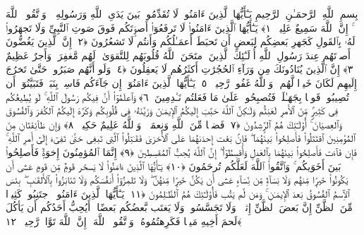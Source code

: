 
  
    
  
    
    

\nopagebreak
  بِسمِ ٱللَّهِ ٱلرَّحمَـٰنِ ٱلرَّحِيمِ
  يَـٰٓأَيُّهَا ٱلَّذِينَ ءَامَنُوا۟ لَا تُقَدِّمُوا۟ بَينَ يَدَىِ ٱللَّهِ وَرَسُولِهِۦ ۖ وَٱتَّقُوا۟ ٱللَّهَ ۚ إِنَّ ٱللَّهَ سَمِيعٌ عَلِيمٌۭ ﴿١﴾
 يَـٰٓأَيُّهَا ٱلَّذِينَ ءَامَنُوا۟ لَا تَرفَعُوٓا۟ أَصوَٟتَكُم فَوقَ صَوتِ ٱلنَّبِىِّ وَلَا تَجهَرُوا۟ لَهُۥ بِٱلقَولِ كَجَهرِ بَعضِكُم لِبَعضٍ أَن تَحبَطَ أَعمَـٰلُكُم وَأَنتُم لَا تَشعُرُونَ ﴿٢﴾
 إِنَّ ٱلَّذِينَ يَغُضُّونَ أَصوَٟتَهُم عِندَ رَسُولِ ٱللَّهِ أُو۟لَـٰٓئِكَ ٱلَّذِينَ ٱمتَحَنَ ٱللَّهُ قُلُوبَهُم لِلتَّقوَىٰ ۚ لَهُم مَّغفِرَةٌۭ وَأَجرٌ عَظِيمٌ ﴿٣﴾
 إِنَّ ٱلَّذِينَ يُنَادُونَكَ مِن وَرَآءِ ٱلحُجُرَٰتِ أَكثَرُهُم لَا يَعقِلُونَ ﴿٤﴾
 وَلَو أَنَّهُم صَبَرُوا۟ حَتَّىٰ تَخرُجَ إِلَيهِم لَكَانَ خَيرًۭا لَّهُم ۚ وَٱللَّهُ غَفُورٌۭ رَّحِيمٌۭ ﴿٥﴾
 يَـٰٓأَيُّهَا ٱلَّذِينَ ءَامَنُوٓا۟ إِن جَآءَكُم فَاسِقٌۢ بِنَبَإٍۢ فَتَبَيَّنُوٓا۟ أَن تُصِيبُوا۟ قَومًۢا بِجَهَـٰلَةٍۢ فَتُصبِحُوا۟ عَلَىٰ مَا فَعَلتُم نَـٰدِمِينَ ﴿٦﴾
 وَٱعلَمُوٓا۟ أَنَّ فِيكُم رَسُولَ ٱللَّهِ ۚ لَو يُطِيعُكُم فِى كَثِيرٍۢ مِّنَ ٱلأَمرِ لَعَنِتُّم وَلَـٰكِنَّ ٱللَّهَ حَبَّبَ إِلَيكُمُ ٱلإِيمَـٰنَ وَزَيَّنَهُۥ فِى قُلُوبِكُم وَكَرَّهَ إِلَيكُمُ ٱلكُفرَ وَٱلفُسُوقَ وَٱلعِصيَانَ ۚ أُو۟لَـٰٓئِكَ هُمُ ٱلرَّٟشِدُونَ ﴿٧﴾
 فَضلًۭا مِّنَ ٱللَّهِ وَنِعمَةًۭ ۚ وَٱللَّهُ عَلِيمٌ حَكِيمٌۭ ﴿٨﴾
 وَإِن طَآئِفَتَانِ مِنَ ٱلمُؤمِنِينَ ٱقتَتَلُوا۟ فَأَصلِحُوا۟ بَينَهُمَا ۖ فَإِنۢ بَغَت إِحدَىٰهُمَا عَلَى ٱلأُخرَىٰ فَقَـٰتِلُوا۟ ٱلَّتِى تَبغِى حَتَّىٰ تَفِىٓءَ إِلَىٰٓ أَمرِ ٱللَّهِ ۚ فَإِن فَآءَت فَأَصلِحُوا۟ بَينَهُمَا بِٱلعَدلِ وَأَقسِطُوٓا۟ ۖ إِنَّ ٱللَّهَ يُحِبُّ ٱلمُقسِطِينَ ﴿٩﴾
 إِنَّمَا ٱلمُؤمِنُونَ إِخوَةٌۭ فَأَصلِحُوا۟ بَينَ أَخَوَيكُم ۚ وَٱتَّقُوا۟ ٱللَّهَ لَعَلَّكُم تُرحَمُونَ ﴿١٠﴾
 يَـٰٓأَيُّهَا ٱلَّذِينَ ءَامَنُوا۟ لَا يَسخَر قَومٌۭ مِّن قَومٍ عَسَىٰٓ أَن يَكُونُوا۟ خَيرًۭا مِّنهُم وَلَا نِسَآءٌۭ مِّن نِّسَآءٍ عَسَىٰٓ أَن يَكُنَّ خَيرًۭا مِّنهُنَّ ۖ وَلَا تَلمِزُوٓا۟ أَنفُسَكُم وَلَا تَنَابَزُوا۟ بِٱلأَلقَـٰبِ ۖ بِئسَ ٱلِٱسمُ ٱلفُسُوقُ بَعدَ ٱلإِيمَـٰنِ ۚ وَمَن لَّم يَتُب فَأُو۟لَـٰٓئِكَ هُمُ ٱلظَّـٰلِمُونَ ﴿١١﴾
 يَـٰٓأَيُّهَا ٱلَّذِينَ ءَامَنُوا۟ ٱجتَنِبُوا۟ كَثِيرًۭا مِّنَ ٱلظَّنِّ إِنَّ بَعضَ ٱلظَّنِّ إِثمٌۭ ۖ وَلَا تَجَسَّسُوا۟ وَلَا يَغتَب بَّعضُكُم بَعضًا ۚ أَيُحِبُّ أَحَدُكُم أَن يَأكُلَ لَحمَ أَخِيهِ مَيتًۭا فَكَرِهتُمُوهُ ۚ وَٱتَّقُوا۟ ٱللَّهَ ۚ إِنَّ ٱللَّهَ تَوَّابٌۭ رَّحِيمٌۭ ﴿١٢﴾
